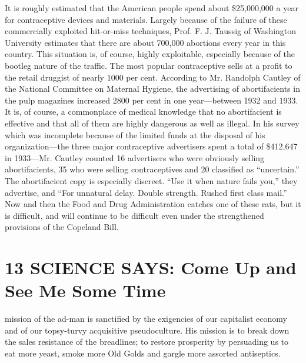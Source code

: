 \documentclass[openany,nobib]{tufte-book}
\let\oldchapter\chapter
\def\chapter{%
  \setcounter{footnote}{0}%
  \oldchapter
}
\begin{document}
It is roughly estimated that the American people spend about
\$25,000,000 a year for contraceptive devices and materials. Largely
because of the failure of these commercially exploited hit-or-miss
techniques, Prof. F. J. Taussig of Washington University estimates that
there are about 700,000 abortions every year in this country. This
situation is, of course, highly exploitable, especially because of the
bootleg nature of the traffic. The most popular contraceptive sells at a
profit to the retail druggist of nearly 1000 per cent. According to Mr.
Randolph Cautley of the National Committee on Maternal Hygiene, the
advertising of abortifacients in the pulp magazines increased 2800 per
cent in one year---between 1932 and 1933. It is, of course, a
commonplace of medical knowledge that no abortifacient is effective and
that all of them are highly dangerous as well as illegal. In his survey
which was incomplete because of the limited funds at the disposal of his
organization---the three major contraceptive advertisers spent a total
of \$412,647 in 1933---Mr. Cautley counted 16 advertisers who were
obviously selling abortifacients, 35 who were selling contraceptives and
20 classified as ``uncertain.'' The abortifacient copy is especially
discreet. ``Use it when nature fails you,'' they advertise, and ``For
unnatural delay. Double strength. Rushed first class mail.'' Now and
then the Food and Drug Administration catches one of these rats, but it
is difficult, and will continue to be difficult even under the
strengthened provisions of the Copeland Bill.
 

\chapter[13 \hspace*{1mm} SCIENCE SAYS: Come Up and See Me Some Time]{13 SCIENCE SAYS: Come Up and See Me Some Time}

 mission of the ad-man is sanctified by the exigencies of our
capitalist economy and of our topsy-turvy acquisitive pseudoculture. His
mission is to break down the sales resistance of the breadlines; to
restore prosperity by persuading us to eat more yeast, smoke more Old
Golds and gargle more assorted antiseptics.
\end{document}
